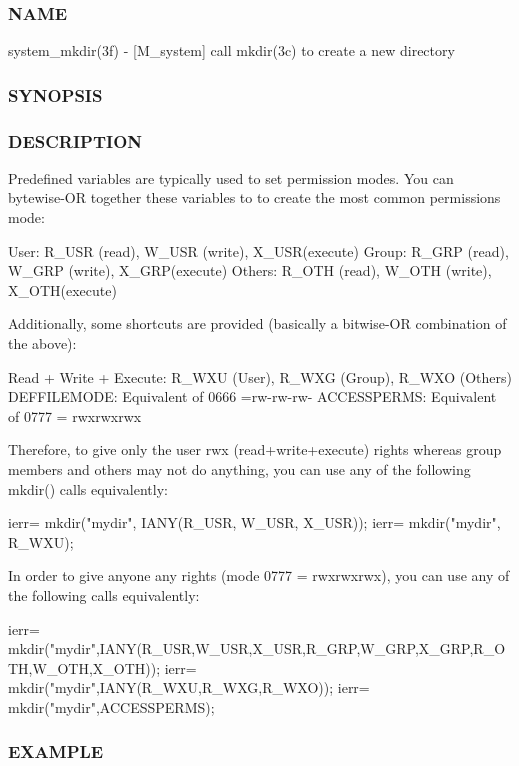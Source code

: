 \subsubsection*{N\+A\+ME}

system\+\_\+mkdir(3f) -\/ \mbox{[}M\+\_\+system\mbox{]} call mkdir(3c) to create a new directory \subsubsection*{S\+Y\+N\+O\+P\+S\+IS}

\subsubsection*{D\+E\+S\+C\+R\+I\+P\+T\+I\+ON}

\begin{DoxyVerb}Predefined variables are typically used to set permission modes.
You can bytewise-OR together these variables to to create the most common
permissions mode:

 User:    R_USR  (read),  W_USR  (write),  X_USR(execute)
 Group:   R_GRP  (read),  W_GRP  (write),  X_GRP(execute)
 Others:  R_OTH  (read),  W_OTH  (write),  X_OTH(execute)

Additionally, some shortcuts are provided (basically a bitwise-OR combination of the above):

  Read + Write + Execute: R_WXU (User), R_WXG (Group), R_WXO (Others)
  DEFFILEMODE: Equivalent of 0666 =rw-rw-rw-
  ACCESSPERMS: Equivalent of 0777 = rwxrwxrwx

Therefore, to give only the user rwx (read+write+execute) rights whereas
group members and others may not do anything, you can use any of the
following mkdir() calls equivalently:

  ierr= mkdir("mydir", IANY(R_USR, W_USR, X_USR));
  ierr= mkdir("mydir", R_WXU);

In order to give anyone any rights (mode 0777 = rwxrwxrwx), you can
use any of the following calls equivalently:

  ierr= mkdir("mydir",IANY(R_USR,W_USR,X_USR,R_GRP,W_GRP,X_GRP,R_OTH,W_OTH,X_OTH));
  ierr= mkdir("mydir",IANY(R_WXU,R_WXG,R_WXO));
  ierr= mkdir("mydir",ACCESSPERMS);
\end{DoxyVerb}


\subsubsection*{E\+X\+A\+M\+P\+LE}

